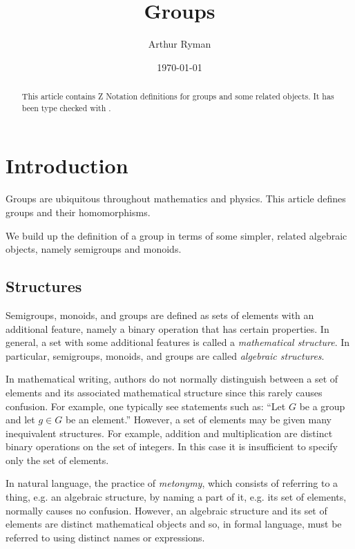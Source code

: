 \documentclass{amsart}
\begin{document}
\title{Groups}
\author{Arthur Ryman}
\date{\today}

\begin{abstract}
This article contains Z Notation definitions for groups and some related objects.
It has been type checked with \fuzz.
\end{abstract}

\maketitle

\tableofcontents

\section{Introduction}

Groups are ubiquitous throughout mathematics and physics.
This article defines groups and their homomorphisms.

We build up the definition of a group in terms of some simpler, related algebraic objects,
namely semigroups and monoids.

\subsection{Structures}

Semigroups, monoids, and groups are defined as sets of elements with an additional feature,
namely a binary operation that has certain properties.
In general, a set with some additional features is called a \textit{mathematical structure}.
In particular, semigroups, monoids, and groups are called \textit{algebraic structures}. 

In mathematical writing, authors do not normally distinguish between a set of elements and its associated mathematical structure
since this rarely causes confusion.
For example, one typically see statements such as:  ``Let $G$ be a group and let $g \in G$ be an element.''
However, a set of elements may be given many inequivalent structures.
For example, addition and multiplication are distinct binary operations on the set of integers.
In this case it is insufficient to specify only the set of elements.

In natural language, the practice of \textit{metonymy}, which consists of referring to a thing, e.g. an algebraic structure, 
by naming a part of it, e.g. its set of elements, normally causes no confusion.
However, an algebraic structure and its set of elements are distinct mathematical objects
and so, in formal language, must be referred to using distinct names or expressions.
\end{document}
